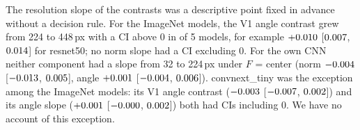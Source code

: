 The resolution slope of the contrasts was a descriptive point fixed in advance without a
decision rule. For the ImageNet models, the V1 angle contrast grew from 224 to 448\,px
with a CI above 0 in \SepSlopeAngleCiPositive{} of 5 models, for example
$+0.010$ [$0.007$,
$0.014$] for resnet50; no norm slope had a CI excluding 0. For
the own CNN neither component had a slope from 32 to 224\,px under $F$ = center (norm
$-0.004$ [$-0.013$, $0.005$], angle
$+0.001$ [$-0.004$, $0.006$]).
convnext\_tiny was the exception among the ImageNet models: its V1 angle contrast
($-0.003$ [$-0.007$,
$0.002$]) and its angle slope ($+0.001$
[$-0.000$, $0.002$]) both had CIs
including 0. We have no account of this exception.

